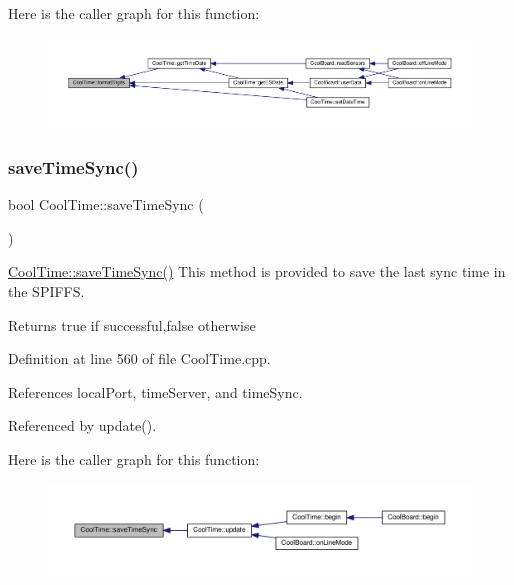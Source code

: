 Here is the caller graph for this function\+:
\nopagebreak
\begin{figure}[H]
\begin{center}
\leavevmode
\includegraphics[width=350pt]{d6/d49/class_cool_time_acd537cd4210d7bde4e1f5c47d2ac0456_icgraph}
\end{center}
\end{figure}
\mbox{\label{class_cool_time_ae9658c9b377510d469e3b88edf33ee85}} 
\subsubsection{\texorpdfstring{save\+Time\+Sync()}{saveTimeSync()}}
{\footnotesize\ttfamily bool Cool\+Time\+::save\+Time\+Sync (\begin{DoxyParamCaption}{ }\end{DoxyParamCaption})}

\hyperlink{class_cool_time_ae9658c9b377510d469e3b88edf33ee85}{Cool\+Time\+::save\+Time\+Sync()} This method is provided to save the last sync time in the S\+P\+I\+F\+FS.

\begin{DoxyReturn}{Returns}
true if successful,false otherwise 
\end{DoxyReturn}


Definition at line 560 of file Cool\+Time.\+cpp.



References local\+Port, time\+Server, and time\+Sync.



Referenced by update().

Here is the caller graph for this function\+:
\nopagebreak
\begin{figure}[H]
\begin{center}
\leavevmode
\includegraphics[width=350pt]{d6/d49/class_cool_time_ae9658c9b377510d469e3b88edf33ee85_icgraph}
\end{center}
\end{figure}


